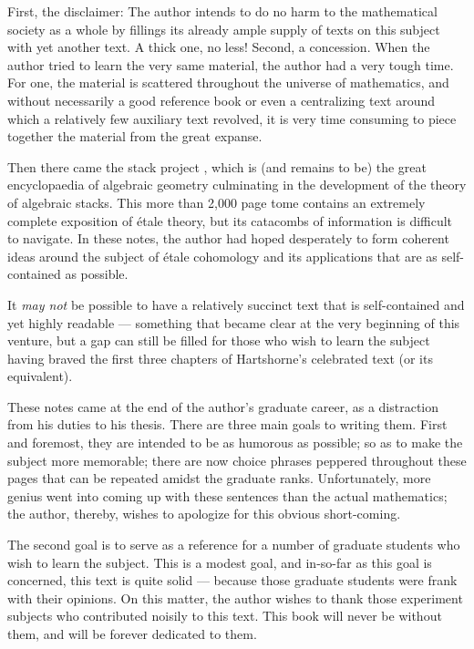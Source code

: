 \Preface

First, the disclaimer: The author intends to do no harm to the
mathematical society as a whole by fillings its already ample
supply of texts on this subject with yet another text. A thick
one, no less! Second, a concession. When the author tried to
learn the very same material, the author had a very tough time.
For one, the material is scattered throughout the universe of
mathematics, and without necessarily a good reference book or
even a centralizing text around which a relatively few auxiliary
text revolved, it is very time consuming to piece together the 
material from the great expanse.

Then there came the stack project \cite{Stack}, which is (and 
remains to be) the great encyclopaedia of algebraic geometry 
culminating in the development of the theory of algebraic stacks. 
This more than 2,000 page tome contains an extremely complete 
exposition of \'etale theory, but its catacombs of information is 
difficult to navigate. In these notes, the author had hoped 
desperately to form coherent ideas around the subject of \'etale 
cohomology and its applications that are as self-contained as 
possible.

It \emph{may not} be possible to have a relatively succinct text 
that is self-contained and yet highly readable --- something that 
became clear at the very beginning of this venture, but a gap can 
still be filled for those who wish to learn the subject having 
braved the first three chapters of Hartshorne's celebrated text 
(or its equivalent).

These notes came at the end of the author's graduate career,
as a distraction from his duties to his thesis. There are three
main goals to writing them. First and foremost, they are intended
to be as humorous as possible; so as to make the subject more
memorable; there are now choice phrases peppered throughout 
these pages that can be repeated amidst the graduate ranks. 
Unfortunately, more genius went into coming up with these 
sentences than the actual mathematics; the author, thereby, wishes 
to apologize for this obvious short-coming.

The second goal is to serve as a reference for a number of 
graduate students who wish to learn the subject. This
is a modest goal, and in-so-far as this goal is concerned, this 
text is quite solid --- because those graduate students were frank 
with their opinions. On this matter, the author wishes to thank 
those experiment subjects who contributed noisily to this text. 
This book will never be without them, and will be forever 
dedicated to them.

